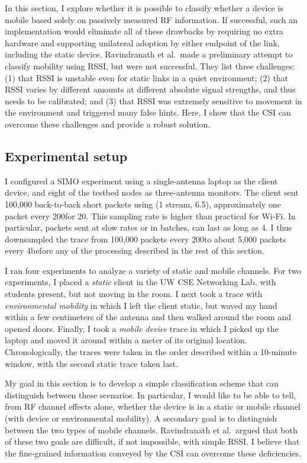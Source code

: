 In this section, I explore whether it is possible to classify whether a device is mobile based solely on passively measured RF information. If successful, such an implementation would eliminate all of these drawbacks by requiring no extra hardware and supporting unilateral adoption by either endpoint of the link, including the static device. Ravindranath et al.\ made a preliminary attempt to classify mobility using RSSI, but were not successful. They list three challenges: (1) that RSSI is unstable even for static links in a quiet environment; (2) that RSSI varies by different amounts at different absolute signal strengths, and thus needs to be calibrated; and (3) that RSSI was extremely sensitive to movement in the environment and triggered many false hints. Here, I show that the CSI can overcome these challenges and provide a robust solution.

\subsection{Experimental setup}
I configured a SIMO experiment using a single-antenna laptop as the client device, and eight of the testbed nodes as three-antenna monitors. The client sent 100,000 back-to-back short packets using  (1 stream, 6.5\Mbps), approximately one packet every 200\us for 20\s. This sampling rate is higher than practical for Wi-Fi. In particular, packets sent at slow rates or in batches, can last as long as 4\ms. I thus downsampled the trace from 100,000 packets every 200\us to about 5,000 packets every 4\ms before any of the processing described in the rest of this section.

I ran four experiments to analyze a variety of static and mobile channels. For two experiments, I placed a \emph{static} client in the UW CSE Networking Lab, with students present, but not moving in the room. I next took a trace with \emph{environmental mobility} in which I left the client static, but waved my hand within a few centimeters of the antenna and then walked around the room and opened doors. Finally, I took a \emph{mobile device} trace in which I picked up the laptop and moved it around within a meter of its original location. Chronologically, the traces were taken in the order described within a 10-minute window, with the second static trace taken last.

My goal in this section is to develop a simple classification scheme that can distinguish between these scenarios. In particular, I would like to be able to tell, from RF channel effects alone, whether the device is in a static or mobile channel (with device or environmental mobility). A secondary goal is to distinguish between the two types of mobile channels. Ravindranath et al.\ argued that both of these two goals are difficult, if not impossible, with simple RSSI. I believe that the fine-grained information conveyed by the CSI can overcome these deficiencies.


